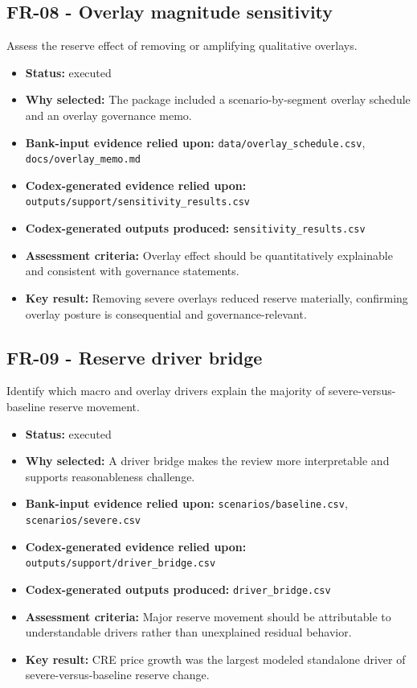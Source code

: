 \documentclass[11pt]{article}
\begin{document}
\subsection*{FR-08 - Overlay magnitude sensitivity}
Assess the reserve effect of removing or amplifying qualitative overlays.
\begin{itemize}
\item \textbf{Status:} executed
\item \textbf{Why selected:} The package included a scenario-by-segment overlay schedule and an overlay governance memo.
\item \textbf{Bank-input evidence relied upon:} \texttt{data/overlay\_schedule.csv}, \texttt{docs/overlay\_memo.md}
\item \textbf{Codex-generated evidence relied upon:} \texttt{outputs/support/sensitivity\_results.csv}
\item \textbf{Codex-generated outputs produced:} \texttt{sensitivity\_results.csv}
\item \textbf{Assessment criteria:} Overlay effect should be quantitatively explainable and consistent with governance statements.
\item \textbf{Key result:} Removing severe overlays reduced reserve materially, confirming overlay posture is consequential and governance-relevant.
\end{itemize}
\subsection*{FR-09 - Reserve driver bridge}
Identify which macro and overlay drivers explain the majority of severe-versus-baseline reserve movement.
\begin{itemize}
\item \textbf{Status:} executed
\item \textbf{Why selected:} A driver bridge makes the review more interpretable and supports reasonableness challenge.
\item \textbf{Bank-input evidence relied upon:} \texttt{scenarios/baseline.csv}, \texttt{scenarios/severe.csv}
\item \textbf{Codex-generated evidence relied upon:} \texttt{outputs/support/driver\_bridge.csv}
\item \textbf{Codex-generated outputs produced:} \texttt{driver\_bridge.csv}
\item \textbf{Assessment criteria:} Major reserve movement should be attributable to understandable drivers rather than unexplained residual behavior.
\item \textbf{Key result:} CRE price growth was the largest modeled standalone driver of severe-versus-baseline reserve change.
\end{itemize}
\end{document}
